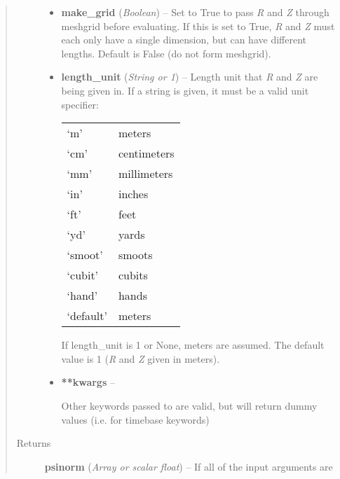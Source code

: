 \documentclass[letterpaper,10pt,english]{sphinxmanual}
\begin{document}
\begin{fulllineitems}
\begin{fulllineitems}
\begin{quote}
\begin{description}
\begin{itemize}
\item {} 
\textbf{make\_grid} (\emph{Boolean}) --
Set to True to pass \emph{R} and \emph{Z} through
meshgrid before evaluating. If this is set to True, \emph{R} and \emph{Z}
must each only have a single dimension, but can have different
lengths.  Default is False (do not form meshgrid).

\item {} 
\textbf{length\_unit} (\emph{String or 1}) --
Length unit that \emph{R} and \emph{Z} are being
given in. If a string is given, it must be a valid unit
specifier:

\begin{tabulary}{\linewidth}{|L|L|}
\hline

`m'
 & 
meters
\\

`cm'
 & 
centimeters
\\

`mm'
 & 
millimeters
\\

`in'
 & 
inches
\\

`ft'
 & 
feet
\\

`yd'
 & 
yards
\\

`smoot'
 & 
smoots
\\

`cubit'
 & 
cubits
\\

`hand'
 & 
hands
\\

`default'
 & 
meters
\\
\hline\end{tabulary}


If length\_unit is 1 or None, meters are assumed. The default
value is 1 (\emph{R} and \emph{Z} given in meters).

\item {} 
\textbf{**kwargs} --

Other keywords passed to  are
valid, but will return dummy values (i.e. for timebase keywords)

\end{itemize}

\item[{Returns}] \leavevmode

\textbf{psinorm} (\emph{Array or scalar float}) --
If all of the input arguments are
\begin{quote}


\end{quote}
\end{description}
\end{quote}
\end{fulllineitems}
\end{fulllineitems}
\end{document}

